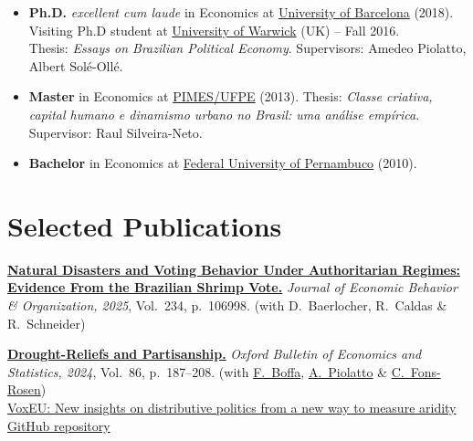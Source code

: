 \documentclass[a4paper,9pt]{article}
\newcommand{\cvgap}{\vspace{2mm}}
\begin{document}
\begin{itemize}

\item{\textbf{Ph.D.} \emph{excellent cum laude} in Economics at \href{http://www.ub.edu/school-economics/}{University of Barcelona} (2018). \\ Visiting Ph.D student at \href{https://warwick.ac.uk/fac/soc/economics/}{University of Warwick} (UK) -- Fall 2016. \\ Thesis: \emph{Essays on Brazilian Political Economy}. Supervisors: Amedeo Piolatto, Albert Sol\'e-Oll\'e.}

\item{\textbf{Master} in Economics at \href{https://sites.google.com/view/pimes/principal}{PIMES/UFPE} (2013). Thesis: \emph{Classe criativa, capital humano e dinamismo urbano no Brasil: uma análise empírica}. Supervisor: Raul Silveira-Neto.}

\item{\textbf{Bachelor} in Economics at \href{https://www.ufpe.br/ccsa/}{Federal University of Pernambuco} (2010).}

\end{itemize}

\section{Selected Publications}

\textbf{\href{https://doi.org/10.1016/j.jebo.2025.106998}{Natural Disasters and Voting Behavior Under Authoritarian Regimes: Evidence From the Brazilian Shrimp Vote.}} \emph{Journal of Economic Behavior \& Organization, 2025}, Vol.~234, p.~106998. (with D.~Baerlocher, R.~Caldas \& R.~Schneider)

\cvgap

\textbf{\href{https://onlinelibrary.wiley.com/doi/full/10.1111/obes.12560}{Drought-Reliefs and Partisanship.}} \emph{Oxford Bulletin of Economics and Statistics, 2024}, Vol.~86, p.~187--208. (with \href{https://sites.google.com/site/federicoboffaunibz/}{F.~Boffa}, \href{https://sites.google.com/site/piolatto/home}{A.~Piolatto} \& \href{https://sites.google.com/site/cfonsrosen/home}{C.~Fons-Rosen}) \\
\hspace{2em} \href{https://voxeu.org/article/insights-distributive-politics-new-way-measure-aridity}{VoxEU: New insights on distributive politics from a new way to measure aridity} \\
\hspace{2em} \href{https://github.com/FranciscoCavalcanti/Drought-reliefs-and-Partisanship}{GitHub repository}
\end{document}
